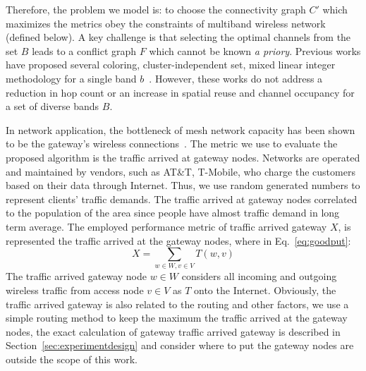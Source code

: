 Therefore, the problem we model is: to choose the connectivity graph $C'$ which maximizes
the metrics obey the constraints of multiband wireless network (defined below).
A key challenge is that selecting the optimal channels from
the set $B$ leads to a conflict graph $F$ which cannot be known {\it a priory}.
Previous works have proposed several coloring, cluster-independent set, 
mixed linear integer methodology for a single band $b$~\cite{peng2012efficient,tang2005interference,doraghinejad2014channel}. 
However, these works do not address a reduction in hop count or an increase in spatial reuse and channel occupancy for a set of 
diverse bands $B$. 

In network application, the bottleneck of mesh network capacity has been 
shown to be the gateway's wireless connections~\cite{robinson2008adding}.
The metric we use to evaluate the proposed algorithm is the traffic arrived at gateway nodes.
Networks are operated and maintained by vendors, such as AT\&T, T-Mobile, who charge the 
customers based on their data through Internet. Thus, we use random generated numbers 
to represent clients' traffic demands. The traffic arrived at gateway nodes correlated 
to the population of the area since people have almost traffic demand in long term average. 
The employed performance metric of traffic arrived gateway $X$, is represented the traffic 
arrived at the gateway nodes, where in Eq.~\ref{eq:goodput}:
\begin{equation}
\label{eq:goodput}
X=\sum_{w \in W, v \in V}T(w,v)
\end{equation}
The traffic arrived gateway node $w\in W$ considers all incoming and outgoing wireless traffic 
from access node $v\in V$ as $T$ onto the Internet.
Obviously, the traffic arrived gateway is also related to the routing and other factors, 
we use a simple routing method to keep the maximum the traffic arrived at the gateway nodes, 
the exact calculation of gateway traffic arrived gateway is described in 
Section~\ref{sec:experimentdesign} and consider where to put the gateway nodes are outside 
the scope of this work.

